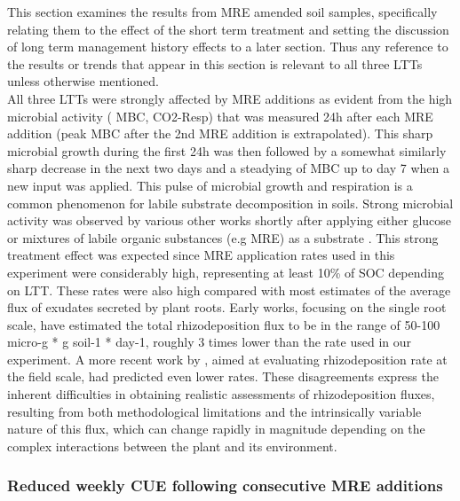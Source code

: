 \documentclass[12pt]{report}
\begin{document}
This section examines the results from MRE amended soil samples, specifically relating them to the effect of the short term treatment and setting the discussion of long term management history effects to a later section. Thus any reference to the results or trends that appear in this section is relevant to all three LTTs unless otherwise mentioned.\\    
All three LTTs were strongly affected by MRE additions as evident from the high microbial activity ( MBC, CO2-Resp) that was measured 24h after each MRE addition (peak MBC after the 2nd MRE addition is extrapolated). This sharp microbial growth during the first 24h was then followed by a somewhat similarly sharp decrease  in the next two days and a steadying of MBC up to day 7 when a new input was applied. This pulse of microbial growth and respiration is a common phenomenon for labile substrate decomposition in soils.  
Strong microbial activity was  observed by various other works shortly after applying either glucose or mixtures of labile organic substances (e.g MRE) as a substrate \citep{hill2008, landi2006, traore2000}.
This strong treatment effect was expected since MRE application rates used in this experiment were considerably high, representing at least 10\% of SOC depending on LTT. These rates were also high compared with most estimates of the average flux of exudates secreted by plant roots. Early works, focusing on the single root scale, have estimated the total rhizodeposition flux to be in the range of 50-100 micro-g * g soil-1 * day-1, roughly 3 times lower than the rate used in our experiment. A more recent work by \citet{pausch2018}, aimed at evaluating rhizodeposition rate at the field scale, had predicted even lower rates. These disagreements express the inherent difficulties in obtaining realistic assessments of rhizodeposition fluxes, resulting from both methodological limitations and the intrinsically variable nature of this flux, which can change rapidly in magnitude depending  on the complex interactions between the plant and its environment.  

\subsubsection{Reduced weekly CUE following consecutive MRE additions}
\end{document}
